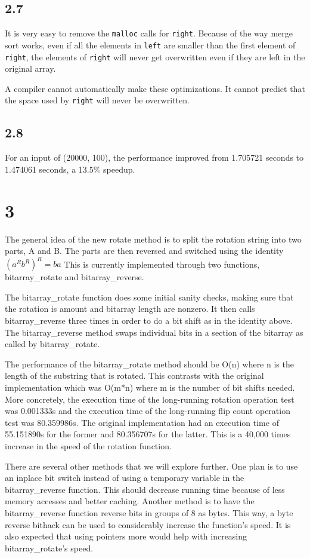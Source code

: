 \documentclass[12pt]{article}
\begin{document}
\subsection{2.7}
It is very easy to remove the {\tt malloc} calls for {\tt right}. Because of the way merge sort works, even if
all the elements in {\tt left} are smaller than the first element of {\tt right}, the elements of {\tt right}
will never get overwritten even if they are left in the original array.

A compiler cannot automatically make these optimizations. It cannot predict that the space used by {\tt right}
will never be overwritten.

\subsection{2.8}
For an input of (20000, 100), the performance improved from 1.705721 seconds to 1.474061 seconds, a 13.5\%
speedup.

\section{3}
The general idea of the new rotate method is to split the rotation string into 
two parts, A and B.  The parts are then reversed and switched using the identity 
$(a^R b^R)^R = ba $  This is currently implemented through two functions, 
bitarray\_rotate and bitarray\_reverse.  

The bitarray\_rotate function does some initial sanity checks, making sure that 
the rotation is amount and bitarray length are nonzero.  It then calls 
bitarray\_reverse three times in order to do a bit shift as in the identity 
above.  The bitarray\_reverse method swaps individual bits in a section of the 
bitarray as called by bitarray\_rotate.  

The performance of the bitarray\_rotate method should be O(n) where n is the 
length of the substring that is rotated.  This contrasts with the original 
implementation which was O(m*n) where m is the number of bit shifts needed.  
More concretely, the execution time of the long-running rotation operation test 
was 0.001333s and the execution time of the long-running flip count operation 
test was 80.359986s.  The original implementation had an execution time of 
55.151890s for the former and 80.356707s for the latter.  This is a 40,000 times 
increase in the speed of the rotation function.  

There are several other methods that we will explore further.  One plan is to 
use an inplace bit switch instead of using a temporary variable in the 
bitarray\_reverse function.  This should decrease running time because of less 
memory accesses and better caching.  Another method is to have the 
bitarray\_reverse function reverse bits in groups of 8 as bytes.  This way, a 
byte reverse bithack can be used to considerably increase the function's speed.  
It is also expected that using pointers more would help with increasing 
bitarray\_rotate's speed.  
\end{document}
